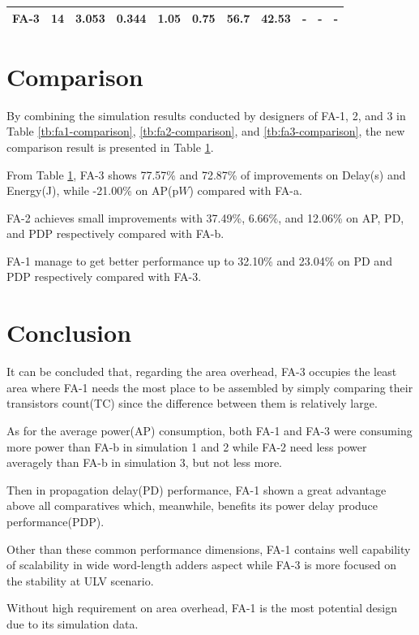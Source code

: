 \documentclass[conference]{IEEEtran}
\begin{document}
\begin{table}[!ht]
\begin{threeparttable}[b]
\begin{tabular}{ c c | *{3}{l} | *{3}{l} | *{3}{l}}
			\cite{18743001}        FA-3 & \bfseries 14 & 3.053                                                                    & \bfseries 0.344                                                       & \bfseries 1.05                                                        & 0.75                  & 56.7           & 42.53             & -                     & -               & -                \\
			\hline
		\end{tabular}
		\label{tb:combine}
	\end{threeparttable}
\end{table}

\newpage

\section{Comparison}
\label{sec:5}

By combining the simulation results conducted by designers of FA-1, 2, and 3 in Table \ref{tb:fa1-comparison}, \ref{tb:fa2-comparison}, and \ref{tb:fa3-comparison},
the new comparison result is presented in Table \ref{tb:combine}.

From Table \ref{tb:combine}, FA-3 shows 77.57\% and 72.87\% of improvements on Delay(\textmugreek s) and Energy(\textalpha J), while -21.00\% on AP(p\(W\)) compared with FA-a.

FA-2 achieves small improvements with 37.49\%, 6.66\%, and 12.06\% on AP, PD, and PDP respectively compared with FA-b.

FA-1 manage to get better performance up to 32.10\% and 23.04\% on PD and PDP respectively compared with FA-3.

\section{Conclusion}
\label{sec:6}

It can be concluded that, regarding the area overhead,
FA-3 occupies the least area where FA-1 needs the most place to be assembled by simply comparing their transistors count(TC)
since the difference between them is relatively large.

As for the average power(AP) consumption, both FA-1 and FA-3 were consuming more power than FA-b in simulation 1 and 2
while FA-2 need less power averagely than FA-b in simulation 3, but not less more.

Then in propagation delay(PD) performance, FA-1 shown a great advantage above all comparatives which, meanwhile, benefits its power delay produce performance(PDP).

Other than these common performance dimensions, FA-1 contains well capability of scalability in wide word-length adders aspect
while FA-3 is more focused on the stability at ULV scenario.

Without high requirement on area overhead, FA-1 is the most potential design due to its simulation data.

\newpage



\end{document}
